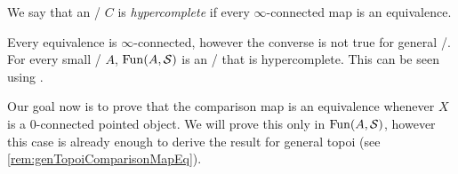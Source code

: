 \begin{definition}
    We say that an \inftytop/ $C$ is \emph{hypercomplete} if every $\infty$-connected map is an equivalence.
\end{definition}
\begin{remark}
    Every equivalence is $\infty$-connected, however the converse is not true for general \inftytops/.
    For every small \inftycat/ $A$, $\operatorname{Fun}(A,\mathcal{S})$ is an \inftytop/ that is hypercomplete.
    This can be seen using \cite[Remark 6.5.4.7]{HTT}.
\end{remark}
Our goal now is to prove that the comparison map is an equivalence whenever $X$ is a $0$-connected pointed object.
We will prove this only in $\operatorname{Fun}(A,\mathcal{S})$, however this case is already enough to derive the result for general topoi (see \cref{rem:genTopoiComparisonMapEq}).

